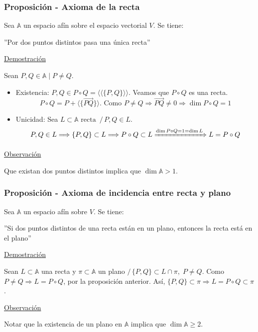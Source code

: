 \documentclass[12pt, a4paper, ones, notitlepage, openany,titlepage]{article}
\begin{document}
\subsubsection{Proposición - Axioma de la recta}
\noindent Sea $\mathbb{A}$ un espacio afín sobre el espacio vectorial $V$. Se tiene:
\begin{center}
	''Por dos puntos distintos pasa una única recta''
\end{center}

\noindent\underline{Demostración}

\noindent Sean $P, Q \in \mathbb{A} \mid P \neq Q$.
\begin{itemize}
	\item Existencia: $P, Q \in P \circ Q = \langle\langle \{P,Q\} \rangle\rangle$. Veamos que $P \circ Q$ es una recta.
	$$
	P \circ Q = P + \langle\{\overrightarrow{PQ}\}\rangle \text{. Como } P \neq Q \Longrightarrow \overrightarrow{PQ} \neq 0 \Longrightarrow \dim P \circ Q = 1
	$$
	\item Unicidad: Sea $L \subset \mathbb{A} \text{ recta } \,/\, P,Q \in L$.
	$$
	P,Q \in L \Longrightarrow \{P,Q\} \subset L \Longrightarrow P \circ Q \subset L \xRightarrow{\dim P \circ Q = 1 = \dim L} L = P \circ Q
	$$
\end{itemize}
\noindent\underline{Observación}

\noindent Que existan dos puntos distintos implica que $\dim \mathbb{A} > 1$.

\subsubsection{Proposición - Axioma de incidencia entre recta y plano}
\noindent Sea $\mathbb{A}$ un espacio afín sobre $V$. Se tiene:
\begin{center}
	''Si dos puntos distintos de una recta están en un plano, entonces la recta está en el plano''
\end{center}
\noindent\underline{Demostración}

Sean $L \subset \mathbb{A}$ una recta y $\pi \subset \mathbb{A}$ un plano $/\, \{P,Q\} \subset L \cap \pi, \; P \neq Q$. Como $P \neq Q \Longrightarrow L = P \circ Q$, por la proposición anterior. Así, $\{P,Q\} \subset \pi \Longrightarrow L = P \circ Q \subset \pi$.

\noindent\underline{Observación}

\noindent Notar que la existencia de un plano en $\mathbb{A}$ implica que $\dim \mathbb{A} \ge 2$.
\end{document}
